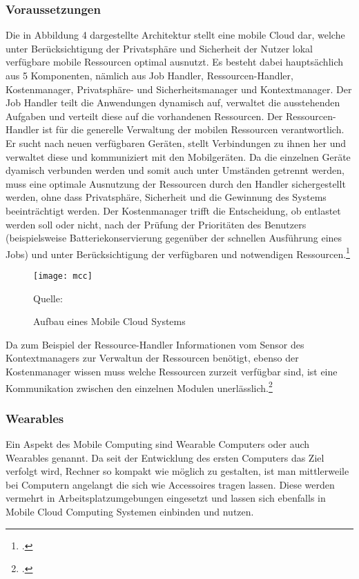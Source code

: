 \subsubsection{Voraussetzungen}
Die in Abbildung 4 dargestellte Architektur stellt eine mobile Cloud dar, welche unter Berücksichtigung der Privatsphäre und Sicherheit der Nutzer lokal verfügbare mobile Ressourcen optimal ausnutzt. Es besteht dabei hauptsächlich aus 5 Komponenten, nämlich aus Job Handler, Ressourcen-Handler, Kostenmanager, Privatsphäre- und Sicherheitsmanager und Kontextmanager. Der Job Handler teilt die Anwendungen dynamisch auf, verwaltet die ausstehenden Aufgaben und verteilt diese auf die vorhandenen Ressourcen. Der Ressourcen-Handler ist für die generelle Verwaltung der mobilen Ressourcen verantwortlich. Er sucht nach neuen verfügbaren Geräten, stellt Verbindungen zu ihnen her und verwaltet diese und kommuniziert mit den Mobilgeräten. Da die einzelnen Geräte dyamisch verbunden werden und somit auch unter Umständen getrennt werden, muss eine optimale Ausnutzung der Ressourcen durch den Handler sichergestellt werden, ohne dass Privatsphäre, Sicherheit und die Gewinnung des Systems beeinträchtigt werden. Der Kostenmanager trifft die Entscheidung, ob entlastet werden soll oder nicht, nach der Prüfung der Prioritäten des Benutzers (beispielsweise Batteriekonservierung gegenüber der schnellen Ausführung eines Jobs) und unter Berücksichtigung der verfügbaren und notwendigen Ressourcen.\footcite[Vgl.][Seite 102 f.]{MCC}

\begin{figure}[H]
\begin{center}
\texttt{[image: mcc]}
\caption{Aufbau eines Mobile Cloud Systems}
Quelle: \cite[Seite 103]{MCC}
\end{center}
\end{figure}
\vspace{-1cm}

Da zum Beispiel der Ressource-Handler Informationen vom Sensor des Kontextmanagers zur Verwaltun der Ressourcen benötigt, ebenso der Kostenmanager wissen muss welche Ressourcen zurzeit verfügbar sind, ist eine Kommunikation zwischen den einzelnen Modulen unerlässlich.\footcite[Vgl.][Seite 103]{MCC}

\subsubsection{Wearables}
Ein Aspekt des Mobile Computing sind Wearable Computers oder auch Wearables genannt. Da seit der Entwicklung des ersten Computers das Ziel verfolgt wird, Rechner so kompakt wie möglich zu gestalten, ist man mittlerweile bei Computern angelangt die sich wie Accessoires tragen lassen. Diese werden vermehrt in Arbeitsplatzumgebungen eingesetzt und lassen sich ebenfalls in Mobile Cloud Computing Systemen einbinden und nutzen.

